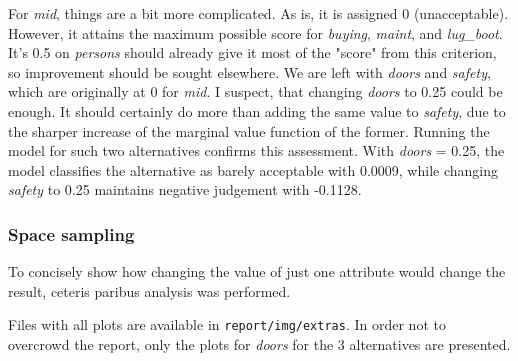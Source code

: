 \documentclass[../main.tex]{subfiles}
\begin{document}
For \emph{mid}, things are a bit more complicated. As is, it is assigned 0 (unacceptable).
However, it attains the maximum possible score for \emph{buying}, \emph{maint}, and \emph{lug\_boot}.
It's 0.5 on \emph{persons} should already give it most of the "score" from this criterion, so improvement
should be sought elsewhere. We are left with \emph{doors} and \emph{safety}, which are originally at 0 for \emph{mid}.
I suspect, that changing \emph{doors} to 0.25 could be enough.
It should certainly do more than adding the same value to \emph{safety}, due to the sharper increase of the
marginal value function of the former. Running the model for such two alternatives confirms this assessment.
With \emph{doors} = 0.25, the model classifies the alternative as barely acceptable with 0.0009,
while changing \emph{safety} to 0.25 maintains negative judgement with -0.1128.

\subsubsection{Space sampling}
To concisely show how changing the value of just one attribute would change the result, ceteris paribus analysis
was performed.

Files with all plots are available in \verb`report/img/extras`. In order not to overcrowd the report,
only the plots for \emph{doors} for the 3 alternatives are presented.
\end{document}
